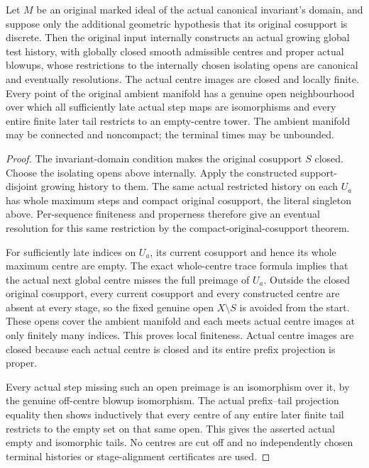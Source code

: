 \begin{theorem}
\label{hir:original-discrete-cosupport-locally-terminal-history}
\leanok
Let $M$ be an original marked ideal of the actual canonical
invariant's domain, and suppose only the additional geometric
hypothesis that its original cosupport is discrete. Then
the original input internally constructs an actual growing
global test history, with globally closed smooth admissible
centres and proper actual blowups, whose restrictions to
the internally chosen isolating opens are canonical and
eventually resolutions. The actual centre images are
closed and locally finite. Every point of the original
ambient manifold has a genuine open neighbourhood over
which all sufficiently late actual step maps are
isomorphisms and every entire finite later tail restricts
to an empty-centre tower. The ambient manifold may be
connected and noncompact; the terminal times may be unbounded.
\end{theorem}
\begin{proof}
The invariant-domain condition makes the original cosupport
$S$ closed. Choose the isolating opens above internally.
Apply the constructed support-disjoint growing history to
them. The same actual restricted history on each $U_a$
has whole maximum steps and compact original cosupport,
the literal singleton above. Per-sequence finiteness and
properness therefore give an eventual resolution for this
same restriction by the compact-original-cosupport theorem.

For sufficiently late indices on $U_a$, its current
cosupport and hence its whole maximum centre are empty.
The exact whole-centre trace formula implies that the
actual next global centre misses the full preimage of
$U_a$. Outside the closed original cosupport, every
current cosupport and every constructed centre are absent
at every stage, so the fixed genuine open $X\setminus S$
is avoided from the start. These opens cover the ambient
manifold and each meets actual centre images at only
finitely many indices. This proves local finiteness.
Actual centre images are closed because each actual
centre is closed and its entire prefix projection is proper.

Every actual step missing such an open preimage is an
isomorphism over it, by the genuine off-centre blowup
isomorphism. The actual prefix--tail projection equality
then shows inductively that every centre of any entire
later finite tail restricts to the empty set on that same
open. This gives the asserted actual empty and isomorphic
tails. No centres are cut off and no independently chosen
terminal histories or stage-alignment certificates are used.
\end{proof}

